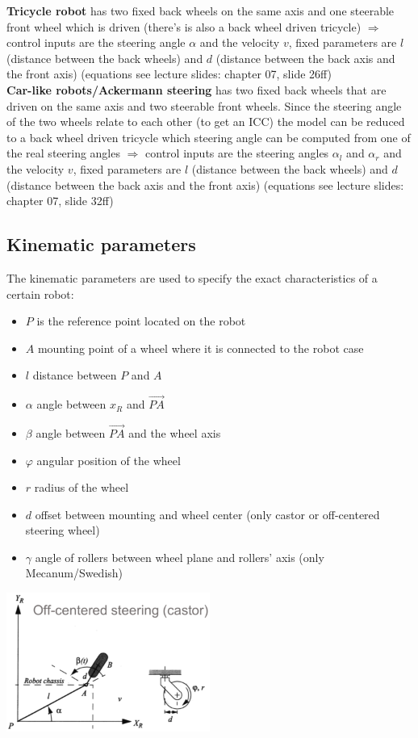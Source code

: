 \documentclass[12pt]{article}
\begin{document}
	\textbf{Tricycle robot} has two fixed back wheels on the same axis and one steerable front wheel which is driven (there's is also a back wheel driven tricycle) $\Rightarrow$ control inputs are the steering angle $\alpha$ and the velocity $v$, fixed parameters are $l$ (distance between the back wheels) and $d$ (distance between the back axis and the front axis) (equations see lecture slides: chapter 07, slide 26ff)\\
	\textbf{Car-like robots/Ackermann steering} has two fixed back wheels that are driven on the same axis and two steerable front wheels. Since the steering angle of the two wheels relate to each other (to get an ICC) the model can be reduced to a back wheel driven tricycle which steering angle can be computed from one of the real steering angles $\Rightarrow$ control inputs are the steering angles $\alpha_l$ and $\alpha_r$ and the velocity $v$, fixed parameters are $l$ (distance between the back wheels) and $d$ (distance between the back axis and the front axis) (equations see lecture slides: chapter 07, slide 32ff)
	
	\subsection{Kinematic parameters}
	The kinematic parameters are used to specify the exact characteristics of a certain robot:
	\begin{itemize}
		\item $P$ is the reference point located on the robot
		\item $A$ mounting point of a wheel where it is connected to the robot case
		\item $l$ distance between $P$ and $A$
		\item $\alpha$ angle between $x_R$ and $\vec{PA}$
		\item $\beta$ angle between $\vec{PA}$ and the wheel axis
		\item $\varphi$ angular position of the wheel
		\item $r$ radius of the wheel
		\item $d$ offset between mounting and wheel center (only castor or off-centered steering wheel)
		\item $\gamma$ angle of rollers between wheel plane and rollers' axis (only Mecanum/Swedish)
	\end{itemize}
	\includegraphics[width=0.5\textwidth]{figures/example-kinematic-parameters.png}
	
\end{document}
